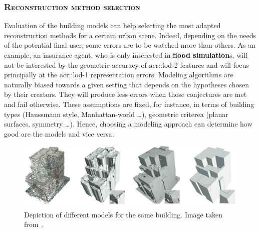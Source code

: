         \subsubsection{\textsc{Reconstruction method selection}}
            Evaluation of the building models can help selecting the most adapted reconstruction methods for a certain urban scene.
            Indeed, depending on the needs of the potential final user, some errors are to be watched more than others.
            As an example, an insurance agent, who is only interested in \textbf{flood simulation}s, will not be interested by the geometric accuracy of \gls{acr::lod}-2 features and will focus principally at the \gls{acr::lod}-1 representation errors.
            Modeling algorithms are naturally biased towards a given setting that depends on the hypotheses chosen by their creators.
            They will produce less errors when those conjectures are met and fail otherwise.
            These assumptions are fixed, for instance, in terms of building types (Haussmann style, Manhattan-world \dots), geometric criterea (planar surfaces, symmetry \dots).
            Hence, choosing a modeling approach can determine how good are the models and vice versa.
            \begin{figure}[htpb]
                \centering
                \includegraphics[width=.7\textwidth]{images/introduction/use/comparison_li}
                \caption[
                    Depiction of different models for the same building.
                ]{
                    \label{fig::comparison}
                    Depiction of different models for the same building.
                    Image taken from~\parencite{li2016manhattan}.
                }
            \end{figure}

